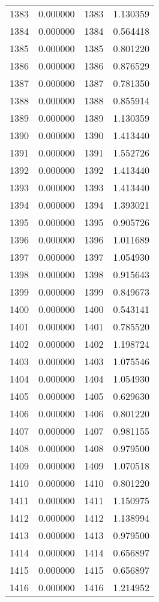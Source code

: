 \documentclass[12pt]{article}
\begin{document}
\begin{longtable}{@{}cccc@{}}
1383 & 0.000000 & 1383 & 1.130359 \\
1384 & 0.000000 & 1384 & 0.564418 \\
1385 & 0.000000 & 1385 & 0.801220 \\
1386 & 0.000000 & 1386 & 0.876529 \\
1387 & 0.000000 & 1387 & 0.781350 \\
1388 & 0.000000 & 1388 & 0.855914 \\
1389 & 0.000000 & 1389 & 1.130359 \\
1390 & 0.000000 & 1390 & 1.413440 \\
1391 & 0.000000 & 1391 & 1.552726 \\
1392 & 0.000000 & 1392 & 1.413440 \\
1393 & 0.000000 & 1393 & 1.413440 \\
1394 & 0.000000 & 1394 & 1.393021 \\
1395 & 0.000000 & 1395 & 0.905726 \\
1396 & 0.000000 & 1396 & 1.011689 \\
1397 & 0.000000 & 1397 & 1.054930 \\
1398 & 0.000000 & 1398 & 0.915643 \\
1399 & 0.000000 & 1399 & 0.849673 \\
1400 & 0.000000 & 1400 & 0.543141 \\
1401 & 0.000000 & 1401 & 0.785520 \\
1402 & 0.000000 & 1402 & 1.198724 \\
1403 & 0.000000 & 1403 & 1.075546 \\
1404 & 0.000000 & 1404 & 1.054930 \\
1405 & 0.000000 & 1405 & 0.629630 \\
1406 & 0.000000 & 1406 & 0.801220 \\
1407 & 0.000000 & 1407 & 0.981155 \\
1408 & 0.000000 & 1408 & 0.979500 \\
1409 & 0.000000 & 1409 & 1.070518 \\
1410 & 0.000000 & 1410 & 0.801220 \\
1411 & 0.000000 & 1411 & 1.150975 \\
1412 & 0.000000 & 1412 & 1.138994 \\
1413 & 0.000000 & 1413 & 0.979500 \\
1414 & 0.000000 & 1414 & 0.656897 \\
1415 & 0.000000 & 1415 & 0.656897 \\
1416 & 0.000000 & 1416 & 1.214952 \\

\end{longtable}
\end{document}

